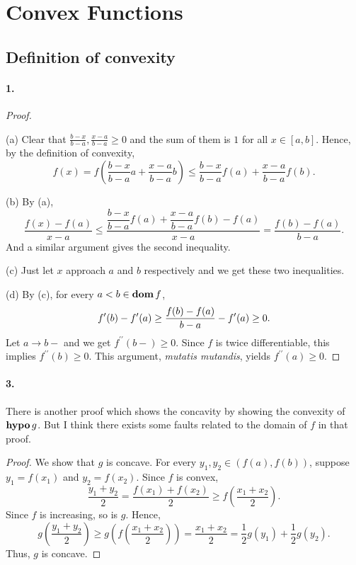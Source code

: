 \section{Convex Functions}
\subsection{Definition of convexity}
  \paragraph{1.}
  \begin{proof}
    $\,$\par
    (a) Clear that $\frac{b-x}{b-a},\frac{x-a}{b-a}\ge 0$ and the sum of them 
    is $1$ for all $x\in[a,b]$. Hence, by the definition of convexity,
    \[
      f(x) = f\left(\frac{b-x}{b-a}a + \frac{x-a}{b-a}b\right) 
      \le \frac{b-x}{b-a}f(a) + \frac{x-a}{b-a}f(b).
    \]\par
    (b) By (a),
    \[
      \frac{f(x)-f(a)}{x-a} \le 
      \frac{\dfrac{b-x}{b-a}f(a)+\dfrac{x-a}{b-a}f(b)-f(a)}{x-a} = 
      \frac{f(b)-f(a)}{b-a}.
    \]
    And a similar argument gives the second inequality.\par
    (c) Just let $x$ approach $a$ and $b$ respectively and we get these two 
    inequalities.\par
    (d) By (c), for every $a<b\in\operatorname{\mathbf{dom}} f$,
    \begin{equation*}
      f^\prime(b)-f^\prime(a) \ge \frac{f(b)-f(a)}{b-a}-f^\prime(a) \ge 0.
    \end{equation*}
    Let $a\to b-$ and we get $f^{\prime\prime}(b-)\ge 0$. Since $f$ is twice
    differentiable, this implies $f^{\prime\prime}(b)\ge 0$. This argument,
    \textit{mutatis mutandis}, yields $f^{\prime\prime}(a)\ge 0$.
  \end{proof}

  \paragraph{3.}
    There is another proof which shows the concavity by showing the convexity of
    $\operatorname{\mathbf{hypo}} g$. But I think there exists some faults related to the domain of $f$
    in that proof.
  \begin{proof}
    We show that $g$ is concave. For every $y_1,y_2\in (f(a), f(b))$, suppose
    $y_1=f(x_1)$ and $y_2=f(x_2)$. Since $f$ is convex, 
    \[
      \frac{y_1+y_2}{2} = \frac{f(x_1)+f(x_2)}{2} \ge 
      f\left(\frac{x_1+x_2}{2}\right).
    \]
    Since $f$ is increasing, so is $g$. Hence,
    \[
      g\left(\frac{y_1+y_2}{2}\right)\ge 
      g\left(f\left(\frac{x_1+x_2}{2}\right)\right) =
      \frac{x_1+x_2}{2} = 
      \frac{1}{2}g(y_1)+\frac{1}{2}g(y_2).
    \]
    Thus, $g$ is concave.
  \end{proof}
  
